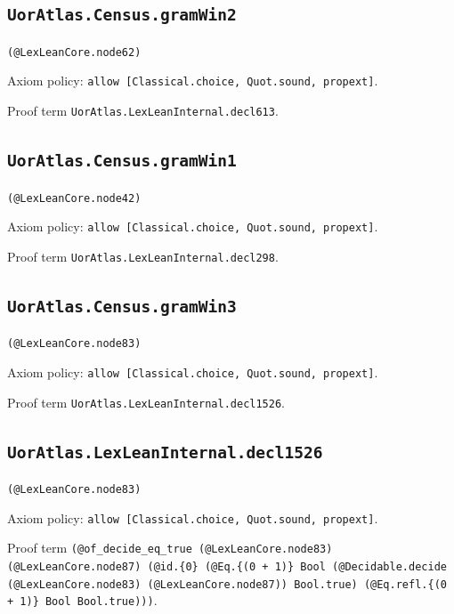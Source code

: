 \documentclass[11pt]{article}
\begin{document}
\subsection*{\texttt{UorAtlas.Census.gramWin2}}
\noindent\texttt{(@LexLeanCore.node62)}\par
\noindent Axiom policy: \texttt{allow [Classical.choice, Quot.sound, propext]}.\par
\noindent Proof term \texttt{UorAtlas.LexLeanInternal.decl613}.\par
\subsection*{\texttt{UorAtlas.Census.gramWin1}}
\noindent\texttt{(@LexLeanCore.node42)}\par
\noindent Axiom policy: \texttt{allow [Classical.choice, Quot.sound, propext]}.\par
\noindent Proof term \texttt{UorAtlas.LexLeanInternal.decl298}.\par
\subsection*{\texttt{UorAtlas.Census.gramWin3}}
\noindent\texttt{(@LexLeanCore.node83)}\par
\noindent Axiom policy: \texttt{allow [Classical.choice, Quot.sound, propext]}.\par
\noindent Proof term \texttt{UorAtlas.LexLeanInternal.decl1526}.\par
\subsection*{\texttt{UorAtlas.LexLeanInternal.decl1526}}
\noindent\texttt{(@LexLeanCore.node83)}\par
\noindent Axiom policy: \texttt{allow [Classical.choice, Quot.sound, propext]}.\par
\noindent Proof term \texttt{(@of\_decide\_eq\_true (@LexLeanCore.node83) (@LexLeanCore.node87) (@id.\{0\} (@Eq.\{(0 + 1)\} Bool (@Decidable.decide (@LexLeanCore.node83) (@LexLeanCore.node87)) Bool.true) (@Eq.refl.\{(0 + 1)\} Bool Bool.true)))}.\par
\end{document}
